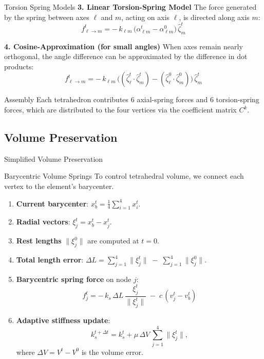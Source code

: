 \documentclass{beamer}
\begin{document}
\begin{frame}[fragile]{Torsion Spring Models}
    \textbf{3. Linear Torsion-Spring Model}
    The force generated by the spring between axes $\ell$ and $m$, acting on axis $\ell$, is directed along axis $m$:
    \begin{equation*}
    \boxed{
    f^t_{\ell\to m} = -\,k_{\ell m}\,\bigl(\alpha^t_{\ell m}-\alpha^0_{\ell m}\bigr)\,\hat\zeta_m^t
    }
    \end{equation*}
    
    \textbf{4. Cosine-Approximation (for small angles)}
    When axes remain nearly orthogonal, the angle difference can be approximated by the difference in dot products:
    \begin{equation*}
    \boxed{
    f^t_{\ell\to m} = -\,k_{\ell m}\,\bigl((\hat\zeta_\ell^t\!\cdot\!\hat\zeta_m^t) - (\hat\zeta_\ell^0\!\cdot\!\hat\zeta_m^0)\bigr)\,\hat\zeta_m^t
    }
    \end{equation*}
    
    \begin{alertblock}{Assembly}
    Each tetrahedron contributes 6 axial-spring forces and 6 torsion-spring forces, which are distributed to the four vertices via the coefficient matrix $C^k$.
    \end{alertblock}
\end{frame}

\subsection{Volume Preservation}

\begin{frame}[fragile]{Simplified Volume Preservation}
    \begin{block}{Barycentric Volume Springs}
    To control tetrahedral volume, we connect each vertex to the element's barycenter.
    \end{block}
    \begin{enumerate}
        \item \textbf{Current barycenter}: $x_b^t=\frac{1}{4}\sum_{i=1}^4 x_i^t$.
        \item \textbf{Radial vectors}: $\xi^t_j=x_b^t - x_j^t$.
        \item \textbf{Rest lengths} $\|\xi^0_j\|$ are computed at $t=0$.
        \item \textbf{Total length error}: $\Delta L=\sum_{j=1}^4\|\xi_j^t\| \;-\;\sum_{j=1}^4\|\xi_j^0\|$.
        \item \textbf{Barycentric spring force} on node $j$:
        \[
            f^t_j = -\,k_s\,\Delta L\,\frac{\xi^t_j}{\|\xi^t_j\|} \;-\;c\,(v_j^t - v_b^t)
        \]
        \item \textbf{Adaptive stiffness update}:
        \[
            k_s^{t+\Delta t} = k_s^t + \mu\,\Delta V\,\sum_{j=1}^4\|\xi_j^t\|,
        \]
        where $\Delta V=V^t-V^0$ is the volume error.
    \end{enumerate}
\end{frame}
\end{document}

